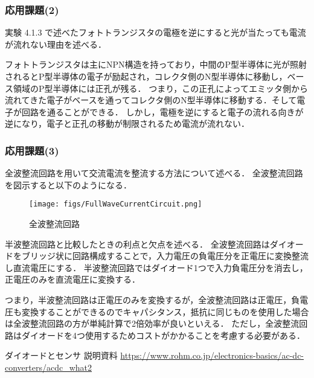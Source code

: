 \documentclass{ltjsarticle}
\begin{document}
\subsubsection{応用課題(2)}
実験 4.1.3 で述べたフォトトランジスタの電極を逆にすると光が当たっても電流が流れない理由を述べる．

フォトトランジスタは主にNPN構造を持っており，中間のP型半導体に光が照射されるとP型半導体の電子が励起され，コレクタ側のN型半導体に移動し，ベース領域のP型半導体には正孔が残る．
つまり，この正孔によってエミッタ側から流れてきた電子がベースを通ってコレクタ側のN型半導体に移動する．そして電子が回路を通ることができる．
しかし，電極を逆にすると電子の流れる向きが逆になり，電子と正孔の移動が制限されるため電流が流れない．

\subsubsection{応用課題(3)}
全波整流回路を用いて交流電流を整流する方法について述べる．
全波整流回路を図示すると以下のようになる．
\begin{figure}[H]
  \centering
  \texttt{[image: figs/FullWaveCurrentCircuit.png]}
  \caption{全波整流回路\cite{zenha}}
\end{figure}

半波整流回路と比較したときの利点と欠点を述べる．
全波整流回路はダイオードをブリッジ状に回路構成することで，入力電圧の負電圧分を正電圧に変換整流し直流電圧にする．
半波整流回路ではダイオード1つで入力負電圧分を消去し，正電圧のみを直流電圧に変換する．

つまり，半波整流回路は正電圧のみを変換するが，全波整流回路は正電圧，負電圧も変換することができるのでキャパシタンス，抵抗に同じものを使用した場合は全波整流回路の方が単純計算で2倍効率が良いといえる．
ただし，全波整流回路はダイオードを4つ使用するためコストがかかることを考慮する必要がある．

\begin{thebibliography}{99}
   
   ダイオードとセンサ 説明資料
   \url{https://www.rohm.co.jp/electronics-basics/ac-dc-converters/acdc_what2}
\end{thebibliography}
\end{document}
